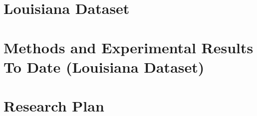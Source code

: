 \documentclass[11pt, twopage, openright]{book}
\begin{document}
\begin{spacing}{1.2}
\newpage
\chapter{Louisiana Dataset}
\localtableofcontents\newpage



\newpage
\chapter{Methods and Experimental Results To Date (Louisiana Dataset)}
\localtableofcontents\newpage






\newpage
\chapter{Research Plan}
\label{sec:Research_Plan}
\localtableofcontents\newpage





\newpage
{}
{}
\printbibliography

\end{spacing}
\end{document}

